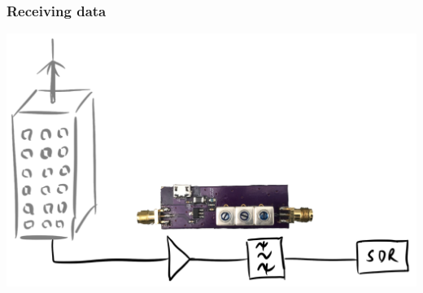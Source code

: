 \documentclass{beamer}
\begin{document}
\begin{frame}
\frametitle{Receiving data}
\includegraphics[width=\textwidth]{figs/antenna-filter.pdf}
\end{frame}
\end{document}

